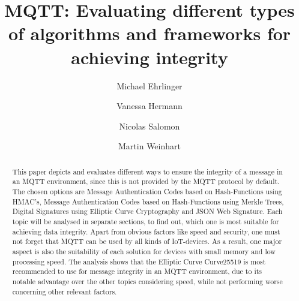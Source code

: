 \documentclass[runningheads]{llncs}
\begin{document}
\title{MQTT: Evaluating different types of algorithms and frameworks for achieving integrity}


\author{Michael Ehrlinger \and Vanessa Hermann \and Nicolas Salomon \and Martin Weinhart}



\maketitle


\begin{abstract}
This paper depicts and evaluates different ways to ensure the integrity of a message in an MQTT environment, since this is not provided by the MQTT protocol by default. The chosen options are Message Authentication Codes based on Hash-Functions using HMAC's, Message Authentication Codes based on Hash-Functions using Merkle Trees, Digital Signatures using Elliptic Curve Cryptography and JSON Web Signature. Each topic will be analysed in separate sections, to find out, which one is most suitable for achieving data integrity. Apart from obvious factors like speed and security, one must not forget that MQTT can be used by all kinds of IoT-devices. As a result, one major aspect is also the suitability of each solution for devices with small memory and low processing speed. The analysis shows that the Elliptic Curve Curve25519 is most recommended to use for message integrity in an MQTT environment, due to its notable advantage over the other topics considering speed, while not performing worse concerning other relevant factors.
\newline

\end{abstract}



\newpage







%
%
\newpage


%
\end{document}
